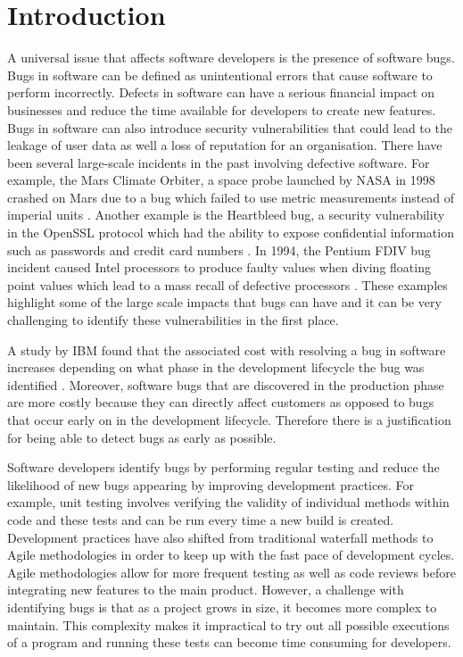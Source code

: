 \documentclass[../main.tex]{subfiles}
\begin{document}
\chapter{Introduction}

A universal issue that affects software developers is the presence of software bugs. Bugs in software can be defined as unintentional errors that cause software to perform incorrectly. Defects in software can have a serious financial impact on businesses and reduce the time available for developers to create new features. Bugs in software can also introduce security vulnerabilities that could lead to the leakage of user data as well a loss of reputation \cite{briski2008minimizing} for an organisation. There have been several large-scale incidents in the past involving defective software. For example, the Mars Climate Orbiter, a space probe launched by NASA in 1998 crashed on Mars due to a bug which failed to use metric measurements instead of imperial units \cite{sauser2009projects}. Another example is the Heartbleed bug, a security vulnerability in the OpenSSL protocol which had the ability to expose confidential information such as passwords and credit card numbers \cite{durumeric2014matter}. In 1994, the Pentium FDIV bug incident caused Intel processors to produce faulty values when diving floating point values which lead to a mass recall of defective processors \cite{pratt1995anatomy}. These examples highlight some of the large scale impacts that bugs can have and it can be very challenging to identify these vulnerabilities in the first place. 

A study by IBM found that the associated cost with resolving a bug in software increases depending on what phase in the development lifecycle the bug was identified \cite{briski2008minimizing}. Moreover, software bugs that are discovered in the production phase are more costly because they can directly affect customers as opposed to bugs that occur early on in the development lifecycle. Therefore there is a justification for being able to detect bugs as early as possible. 

Software developers identify bugs by performing regular testing and reduce the likelihood of new bugs appearing by improving development practices. For example, unit testing involves verifying the validity of individual methods within code and these tests and can be run every time a new build is created. Development practices have also shifted from traditional waterfall methods to Agile methodologies in order to keep up with the fast pace of development cycles. Agile methodologies allow for more frequent testing as well as code reviews before integrating new features to the main product. However, a challenge with identifying bugs is that as a project grows in size, it becomes more complex to maintain. This complexity makes it impractical to try out all possible executions of a program and running these tests can become time consuming for developers. 
\end{document}
